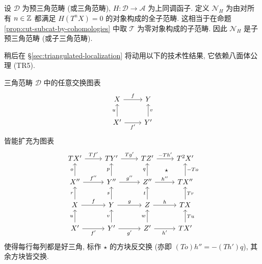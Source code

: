 \begin{example}\label{eg:subcat-N-H}
	设 $\mathcal{D}$ 为预三角范畴 (或三角范畴), $H: \mathcal{D} \to \mathcal{A}$ 为上同调函子. 定义 $\mathcal{N}_H$ 为由对所有 $n \in \mathbb{Z}$ 都满足 $H(T^n X) = 0$ 的对象构成的全子范畴. 这相当于在命题 \ref{prop:cut-subcat-by-cohomologies} 中取 $\mathcal{T}$ 为零对象构成的子范畴. 因此 $\mathcal{N}_H$ 是子预三角范畴 (或子三角范畴).
\end{example}

稍后在 \S\ref{sec:triangulated-localization} 将动用以下的技术性结果, 它依赖八面体公理 (TR5).

\begin{lemma}[J.-L.\ Verdier]\label{prop:triangulated-9-diag}
	三角范畴 $\mathcal{D}$ 中的任意交换图表
	\[\begin{tikzcd}
		X \arrow[r, "f"] & Y \\
		X' \arrow[r, "{f'}"'] \arrow[u, "u"] & Y' \arrow[u, "v"']
	\end{tikzcd}\]
	皆能扩充为图表
	\[\begin{tikzcd}
		TX' \arrow[r, "{Tf'}"] & TY' \arrow[r, "{Tg'}"] & TZ' \arrow[r, "{- Th'}"] & T^2 X' \arrow[phantom, ld, "\star" description] \\
		X'' \arrow[u, "o"] \arrow[r, "{f''}"] & Y'' \arrow[u, "p"] \arrow[r, "{g''}"] & Z'' \arrow[u, "q"] \arrow[r, "h''"] & TX'' \arrow[u, "{-To}"'] \\
		X \arrow[r, "f"] \arrow[u, "r"] & Y \arrow[r, "g"] \arrow[u, "s"] & Z \arrow[r, "h"] \arrow[u, "t"] & TX \arrow[u, "Tr"'] \\
		X' \arrow[r, "{f'}"'] \arrow[u, "u"] & Y' \arrow[r, "{g'}"'] \arrow[u, "v"] & Z' \arrow[r, "{h'}"'] \arrow[u, "w"] & TX' \arrow[u, "Tu"']
	\end{tikzcd}\]
	使得每行每列都是好三角, 标作 $\star$ 的方块反交换 (亦即 $(To) h'' = -(Th') q$), 其余方块皆交换.
\end{lemma}
